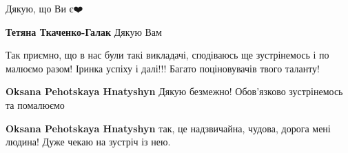  
 
 
 
 

\qqSecCmt


Дякую, що Ви є❤️

\begin{itemize} %
\textbf{Тетяна Ткаченко-Галак} Дякую Вам🙂
\end{itemize} %


Так приємно, що в нас були такі викладачі, сподіваюсь ще зустрінемось і по
малюємо разом! Іринка успіху і далі!!! Багато поціновувачів твого таланту!

\begin{itemize} %
\textbf{Oksana Pehotskaya Hnatyshyn} Дякую безмежно! Обов'язково зустрінемось та помалюємо🙂

\textbf{Oksana Pehotskaya Hnatyshyn} так, це надзвичайна, чудова, дорога мені людина! Дуже чекаю на зустріч із нею.
\end{itemize} %
